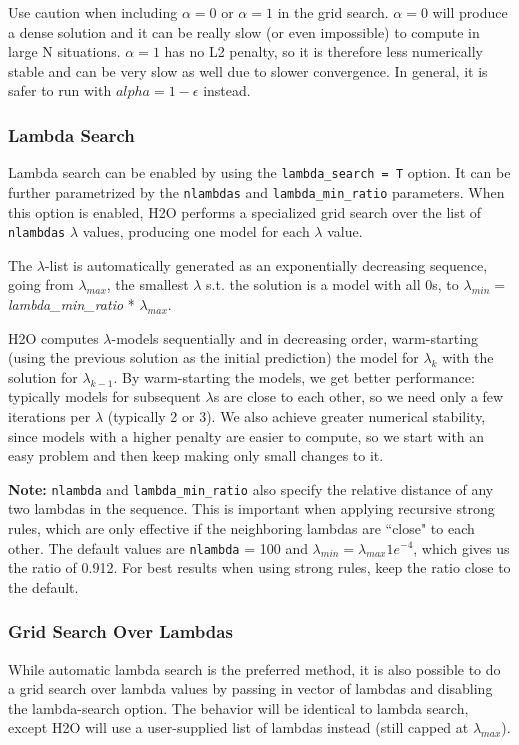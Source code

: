 \documentclass{article}[11pt]
\begin{document}
Use caution when including $\alpha=0$ or $\alpha=1$ in the grid search. $\alpha=0$ will produce a dense solution and it can be really slow (or even impossible) to compute in large N situations. $\alpha=1$ has no L2 penalty, so it is therefore less numerically stable and can be very slow as well due to slower convergence. In general, it is safer to run with $alpha=1-\epsilon$ instead.

\subsubsection{Lambda Search}  %
Lambda search can be enabled by using the \texttt{lambda\_search = T} option. It can be further parametrized by the \texttt{nlambdas} and \texttt{lambda\_min\_ratio} parameters. When this option is enabled, H2O performs a specialized grid search over the list of \texttt{nlambdas} $\lambda$ values, producing one model for each $\lambda$ value. 

The $\lambda$-list is automatically generated as an exponentially decreasing sequence, going from $\lambda_{max}$,
the smallest $\lambda$ s.t. the solution is a model with all 0s, to $\lambda_{min} = $ \textit{lambda\_min\_ratio} * $ \lambda_{max}$. %

H2O computes $\lambda$-models sequentially and in decreasing order, warm-starting (using the previous solution as the initial prediction) the model for $\lambda_k$ with the solution for $\lambda_{k-1}$. By warm-starting the models, we get better performance: typically models for subsequent $\lambda$s are close to each other, so we need only a few iterations per $\lambda$ (typically 2 or 3). We also achieve greater numerical stability, since models with a higher penalty are easier to compute, so we start with an easy problem and then keep making only small changes to it.

\textbf{Note:} \texttt{nlambda} and \texttt{lambda\_min\_ratio} also specify the relative distance of any two lambdas in the sequence. This is important when applying recursive strong rules, which are only effective if the neighboring lambdas are ``close" to each other. The default values are \texttt{nlambda} = 100 and $\lambda_{min} = \lambda_{max} 1e^{-4}$, which gives us the ratio of 0.912.   For best results when using strong rules, keep the ratio close to the default.  
    
\subsubsection{Grid Search Over Lambdas}
While automatic lambda search is the preferred method, it is also possible to do a grid search over lambda values by passing in vector of lambdas and disabling the lambda-search option. The behavior will be identical to lambda search, except H2O will use a user-supplied list of lambdas instead (still capped at $\lambda_{max}$).
\end{document}
